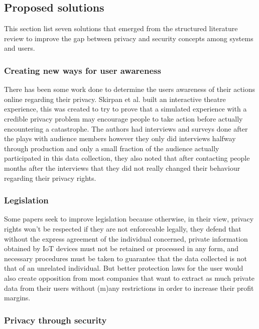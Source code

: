 \documentclass[manuscript,natbib=false]{acmart}
\begin{document}
\subsection{Proposed solutions}

\par This section list seven solutions that emerged from the structured
literature review to improve the gap between privacy and security concepts
among systems and users.

\subsubsection{Creating new ways for user awareness}

There has been some work done to determine the users awareness of their
actions online regarding their privacy. Skirpan et al. \cite{SkirpanPrivacy}
built an interactive theatre experience, this was created to try to prove
that a simulated experience with a credible privacy problem may encourage
people to take action before actually encountering a catastrophe.
The authors had interviews and surveys
done after the plays with audience members however they only did interviews
halfway through production and only a small fraction of the audience actually
participated in this data collection, they also noted that after contacting
people months after the interviews that they did not really changed their
behaviour regarding their privacy rights.

\subsubsection{Legislation}

Some papers seek to improve legislation \cite{WEBER2015618, FabianoInternet}
because otherwise, in their view, privacy rights won't be respected if they
are not enforceable legally, they defend that without the express agreement
of the individual concerned, private information obtained by IoT devices
must not be retained or processed in any form, and necessary procedures
must be taken to guarantee that the data collected is not that of an unrelated
individual. But better protection laws for the user would also create opposition
from most companies that want to extract as much private data from their
users without (m)any restrictions in order to increase their profit margins.

\subsubsection{Privacy through security}
\end{document}
